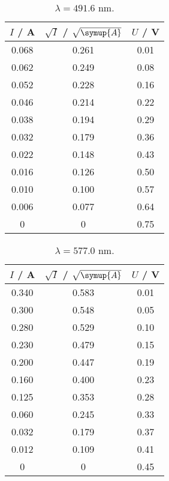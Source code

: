 \begin{table}[!htp]
    \centering
    \caption{$\lambda = 491.6$ nm.} 
    \label{tab:tabelle1}
        \begin{tabular}{c c c}
        
            \toprule
            { $I$ / A} & {$\sqrt{I}$ / $\sqrt{\symup{A}}$} & {$U$ / V} \\
            \midrule
                0.068 & 0.261 & 0.01 \\
                0.062 & 0.249 & 0.08 \\
                0.052 & 0.228 & 0.16 \\
                0.046 & 0.214 & 0.22 \\
                0.038 & 0.194 & 0.29 \\
                0.032 & 0.179 & 0.36 \\
                0.022 & 0.148 & 0.43 \\
                0.016 & 0.126 & 0.50 \\
                0.010 & 0.100 & 0.57 \\
                0.006 & 0.077 & 0.64 \\
                0     & 0 & 0.75 \\
            \bottomrule
        \end{tabular}
        
\end{table}
\begin{table}   
\centering 
 \caption{$\lambda = 577.0$ nm.} 
        \begin{tabular}{c c c}
            \toprule
            { $I$ / A} & {$\sqrt{I}$ / $\sqrt{\symup{A}}$} & {$U$ / V} \\
            \midrule
               0.340 & 0.583 & 0.01 \\
               0.300 & 0.548 & 0.05 \\
               0.280 & 0.529 & 0.10 \\
               0.230 & 0.479 & 0.15 \\
               0.200 & 0.447 & 0.19 \\
               0.160 & 0.400 & 0.23 \\
               0.125 & 0.353 & 0.28 \\
               0.060 & 0.245 & 0.33 \\
               0.032 & 0.179 & 0.37 \\
               0.012 & 0.109 & 0.41 \\
               0     & 0 & 0.45 \\ 
            \bottomrule
        \end{tabular}
       
\end{table}
